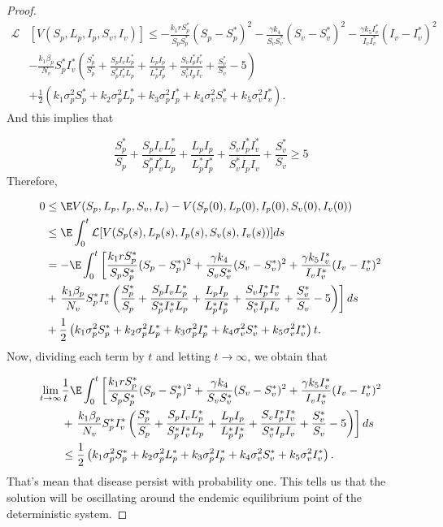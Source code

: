 \begin{proof}
	\begin{align*}
		\mathcal{L}&[V(S_p,L_p,I_p,S_v,I_v)]\leq 
				-\frac{k_1rS_p^*}{S_pS_p^*}(S_p-S_p^*)^2-\frac{\gamma k_4}{S_vS_v^*}(S_v-S_v^*)^2-\frac{\gamma k_5 I_v^*}{I_vI_v^*}(I_v-I_v^*)^2\\
			&-
				\frac{k_1\beta_p}{N_v}S_p^*I_v^*\left(\frac{S_p^*}{S_p}+\frac{S_pI_vL_p^*}{S_p^*I_v^*L_p}+\frac{L_pI_p}{L_p^*I_p^*}+\frac{S_vI_p^*I_v^*}{S_v^*I_pI_v}+\frac{S_v^*}{S_v}-5\right)\\
			&+
				\frac{1}{2}\left(k_1\sigma_p^2S_p^*+k_2\sigma_p^2 L_p^*+k_3\sigma_p^2I_p^*+k_4\sigma_v^2S_v^*+k_5\sigma_v^2I_v^*\right).
	\end{align*}
%
	And this implies that

	\begin{equation*}
			\frac{S_p^*}{S_p}+\frac{S_pI_vL_p^*}{S_p^*I_v^*L_p}+\frac{L_pI_p}{L_p^*I_p^*}+\frac{S_vI_p^*I_v^*}{S_v^*I_pI_v}+\frac{S_v^*}{S_v}\geq 5
	\end{equation*}
	Therefore,
	
	\begin{align*}
		0&\leq \E V(S_p,L_p,I_p,S_v,I_v)-V(S_p(0),L_p(0),I_p(0),S_v(0),I_v(0))\\
			&\leq 
				\E \int_{0}^{t}\mathcal{L}[V(S_p(s),L_p(s),I_p(s),S_v(s),I_v(s))]ds\\
			&=-	
				\E \int_{0}^{t} \left[\frac{k_1rS_p^*}{S_pS_p^*}(S_p-S_p^*)^2+\frac{\gamma k_4}{S_vS_v^*}(S_v-S_v^*)^2+\frac{\gamma k_5 I_v^*}{I_vI_v^*}(I_v-I_v^*)^2\right.\\
			&+
				\left.\frac{k_1\beta_p}{N_v}S_p^*I_v^*\left(\frac{S_p^*}{S_p}+\frac{S_pI_vL_p^*}{S_p^*I_v^*L_p}+\frac{L_pI_p}{L_p^*I_p^*}+\frac{S_vI_p^*I_v^*}{S_v^*I_pI_v}+\frac{S_v^*}{S_v}-5\right)\right]ds\\
			&+
				\frac{1}{2}\left(k_1\sigma_p^2S_p^*+k_2\sigma_p^2 L_p^*+k_3\sigma_p^2I_p^*+k_4\sigma_v^2S_v^*+k_5\sigma_v^2I_v^*\right)t.
	\end{align*}
%
	Now, dividing each term by $t$ and letting $t\rightarrow \infty$, we obtain that
	
	\begin{align*}	
		\lim\limits_{t\rightarrow \infty}&\frac{1}{t}\E \int_{0}^{t} \left[\frac{k_1rS_p^*}{S_pS_p^*}(S_p-S_p^*)^2+\frac{\gamma k_4}{S_vS_v^*}(S_v-S_v^*)^2+\frac{\gamma k_5 I_v^*}{I_vI_v^*}(I_v-I_v^*)^2\right.\\
		&+
		\left.\frac{k_1\beta_p}{N_v}S_p^*I_v^*\left(\frac{S_p^*}{S_p}+\frac{S_pI_vL_p^*}{S_p^*I_v^*L_p}+\frac{L_pI_p}{L_p^*I_p^*}+\frac{S_vI_p^*I_v^*}{S_v^*I_pI_v}+\frac{S_v^*}{S_v}-5\right)\right]ds\\
		&\leq
		\frac{1}{2}\left(k_1\sigma_p^2S_p^*+k_2\sigma_p^2 L_p^*+k_3\sigma_p^2I_p^*+k_4\sigma_v^2S_v^*+k_5\sigma_v^2I_v^*\right).
	\end{align*}
%	
	That's mean that disease persist with probability one. This tells us that the solution will be oscillating around the endemic equilibrium point of the deterministic system.
\end{proof}
